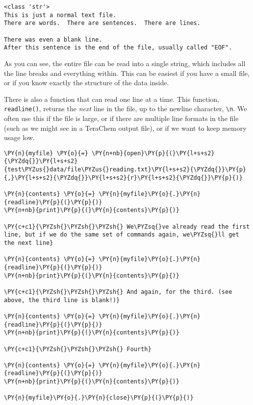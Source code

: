     \begin{Verbatim}[commandchars=\\\{\}]
<class 'str'>
This is just a normal text file.
There are words.  There are sentences.  There are lines.

There was even a blank line.
After this sentence is the end of the file, usually called "EOF".
    \end{Verbatim}

    As you can see, the entire file can be read into a single string, which
includes all the line breaks and everything within. This can be easiest
if you have a small file, or if you know exactly the structure of the
data inside.

There is also a function that can read one line at a time. This
function, \texttt{readline()}, returns the \emph{next} line in the file,
up to the newline character, \texttt{\textbackslash{}n}. We often use
this if the file is large, or if there are multiple line formats in the
file (such as we might see in a TeraChem output file), or if we want to
keep memory usage low.

    \begin{tcolorbox}[breakable, size=fbox, boxrule=1pt, pad at break*=1mm,colback=cellbackground, colframe=cellborder]
\begin{Verbatim}[commandchars=\\\{\}]
\PY{n}{myfile} \PY{o}{=} \PY{n+nb}{open}\PY{p}{(}\PY{l+s+s2}{\PYZdq{}}\PY{l+s+s2}{test\PYZus{}data/file\PYZus{}reading.txt}\PY{l+s+s2}{\PYZdq{}}\PY{p}{,}\PY{l+s+s2}{\PYZdq{}}\PY{l+s+s2}{r}\PY{l+s+s2}{\PYZdq{}}\PY{p}{)}

\PY{n}{contents} \PY{o}{=} \PY{n}{myfile}\PY{o}{.}\PY{n}{readline}\PY{p}{(}\PY{p}{)}
\PY{n+nb}{print}\PY{p}{(}\PY{n}{contents}\PY{p}{)}

\PY{c+c1}{\PYZsh{}\PYZsh{}\PYZsh{} We\PYZsq{}ve already read the first line, but if we do the same set of commands again, we\PYZsq{}ll get the next line}

\PY{n}{contents} \PY{o}{=} \PY{n}{myfile}\PY{o}{.}\PY{n}{readline}\PY{p}{(}\PY{p}{)}
\PY{n+nb}{print}\PY{p}{(}\PY{n}{contents}\PY{p}{)}

\PY{c+c1}{\PYZsh{}\PYZsh{}\PYZsh{} And again, for the third. (see above, the third line is blank!)}

\PY{n}{contents} \PY{o}{=} \PY{n}{myfile}\PY{o}{.}\PY{n}{readline}\PY{p}{(}\PY{p}{)}
\PY{n+nb}{print}\PY{p}{(}\PY{n}{contents}\PY{p}{)}

\PY{c+c1}{\PYZsh{}\PYZsh{}\PYZsh{} Fourth}

\PY{n}{contents} \PY{o}{=} \PY{n}{myfile}\PY{o}{.}\PY{n}{readline}\PY{p}{(}\PY{p}{)}
\PY{n+nb}{print}\PY{p}{(}\PY{n}{contents}\PY{p}{)}

\PY{n}{myfile}\PY{o}{.}\PY{n}{close}\PY{p}{(}\PY{p}{)}
\end{Verbatim}
\end{tcolorbox}

